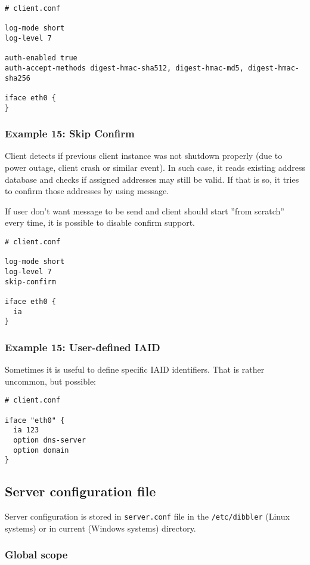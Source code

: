 \begin{lstlisting}
# client.conf

log-mode short
log-level 7

auth-enabled true
auth-accept-methods digest-hmac-sha512, digest-hmac-md5, digest-hmac-sha256

iface eth0 {
}
\end{lstlisting}

\subsubsection{Example 15: Skip Confirm}
\label{example-client-confirm}
Client detects if previous client instance was not shutdown properly
(due to power outage, client crash or similar event). In such case, it
reads existing address database and checks if assigned addresses may
still be valid. If that is so, it tries to confirm those addresses by
using  message.

If user don't want  message to be send and client should
start ''from scratch'' every time, it is possible to disable confirm
support. 

\begin{lstlisting}
# client.conf

log-mode short
log-level 7
skip-confirm

iface eth0 {
  ia
}
\end{lstlisting}

\subsubsection{Example 15: User-defined IAID}
\label{example-client-iaid}
Sometimes it is useful to define specific IAID  identifiers. That is
rather uncommon, but possible:

\begin{lstlisting}
# client.conf

iface "eth0" {
  ia 123 
  option dns-server
  option domain
}
\end{lstlisting}


\subsection{Server configuration file}
\label{server-conf}
Server configuration is stored in \verb+server.conf+ file in the
\verb+/etc/dibbler+ (Linux systems) or in current (Windows systems)
directory. 

\subsubsection{Global scope}

